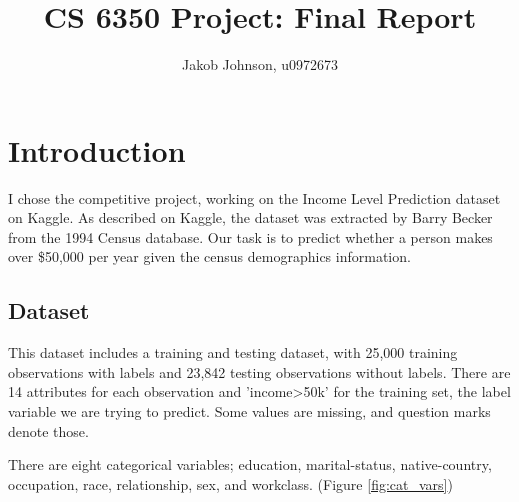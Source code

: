 \documentclass{article}
\begin{document}
\title{CS 6350 Project: Final Report}

\author{Jakob Johnson, u0972673}

\maketitle

\section{Introduction}

I chose the competitive project, working on the Income Level Prediction dataset on Kaggle. As described on Kaggle, the dataset was extracted by Barry Becker from the 1994 Census database. Our task is to predict whether a person makes over \$50,000 per year given the census demographics information. 

\subsection{Dataset}

This dataset includes a training and testing dataset, with 25,000 training observations with labels and 23,842 testing observations without labels. There are 14 attributes for each observation and 'income>50k' for the training set, the label variable we are trying to predict. Some values are missing, and question marks denote those.

There are eight categorical variables; education, marital-status, native-country, occupation, race, relationship, sex, and workclass. (Figure \ref{fig:cat_vars}) 
\end{document}
